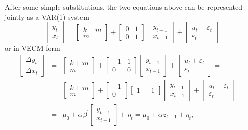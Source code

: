 After some simple substitutions, the two equations above can be
represented jointly as a VAR(1) system
%      
\[ \left[ \begin{array}{c} y_t \\ x_t \end{array} \right] = \left[
  \begin{array}{c} k + m \\ m \end{array} \right] + \left[
  \begin{array}{rr} 0 & 1 \\ 0 & 1 \end{array} \right] \left[
  \begin{array}{c} y_{t-1} \\ x_{t-1} \end{array} \right] + \left[
  \begin{array}{c} u_t + \varepsilon_t \\ \varepsilon_t \end{array}
\right] \]
%	
or in VECM form
%      
\begin{eqnarray*}
  \left[  \begin{array}{c} \Delta y_t \\ \Delta x_t \end{array} \right]  & = & 
  \left[  \begin{array}{c} k + m \\ m \end{array} \right] +
  \left[  \begin{array}{rr} -1 & 1 \\ 0 & 0 \end{array} \right] 
  \left[  \begin{array}{c} y_{t-1} \\ x_{t-1} \end{array} \right] + 
  \left[  \begin{array}{c} u_t + \varepsilon_t \\ \varepsilon_t \end{array} \right] = \\
  & = & 
  \left[  \begin{array}{c} k + m \\ m \end{array} \right] +
  \left[  \begin{array}{r} -1 \\ 0 \end{array} \right]
  \left[  \begin{array}{rr} 1 & -1 \end{array} \right] 
  \left[  \begin{array}{c} y_{t-1} \\ x_{t-1} \end{array} \right] + 
  \left[  \begin{array}{c} u_t + \varepsilon_t \\ \varepsilon_t \end{array} \right] = \\
  & = & 
  \mu_0 + \alpha \beta^{\prime} \left[  \begin{array}{c} y_{t-1} \\ x_{t-1} \end{array} \right] + \eta_t = 
  \mu_0 + \alpha z_{t-1} + \eta_t ,
\end{eqnarray*}
